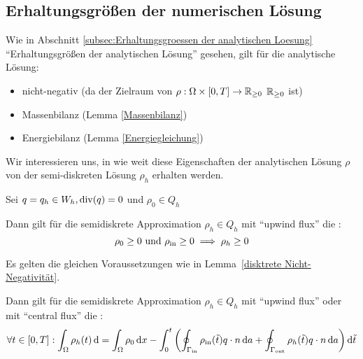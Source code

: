 \subsection{Erhaltungsgrößen der numerischen Lösung}

\begin{repetition}
	Wie in Abschnitt \ref{subsec:Erhaltungsgroessen der analytischen Loesung} \enquote{Erhaltungsgrößen der analytischen Lösung} gesehen, gilt für die analytische Lösung:
	\begin{itemize}
		\item nicht-negativ (da der Zielraum von $ \rho: \Omega \times [0,T] \to \mathbb{R}_{\geq 0}$ $ \mathbb{R}_{\geq 0} $ ist)
		\item Massenbilanz (Lemma \ref{Massenbilanz})
		\item Energiebilanz (Lemma \ref{Energiegleichung})
	\end{itemize}
\end{repetition}

Wir interessieren uns, in wie weit diese Eigenschaften der analytischen Lösung $ \rho $ von der semi-diskreten Lösung $ \rho_h $ erhalten werden.


 
\begin{Lemma} \label{disktrete Nicht-Negativität}
		Sei $ q = q_h \in W_h, \operatorname{div}(q) = 0 $ und $ \rho_0 \in Q_h $ %
	
	Dann gilt für die semidiskrete Approximation $ \rho_h \in Q_h$ mit \enquote{upwind flux} die :
	\[ \rho_0 \geq 0 \text{ und } \rho_{\text{in}} \geq 0 \implies \rho_h \geq 0 \]
\end{Lemma}

\begin{Lemma} \label{diskrete Massenbilanz}
	Es gelten die gleichen Voraussetzungen wie in Lemma~\ref{disktrete Nicht-Negativität}.
	
	Dann gilt für die semidiskrete Approximation $ \rho_h \in Q_h$ mit \enquote{upwind flux} oder mit \enquote{central flux} die :
	\[\forall t \in [0,T]: \int_\Omega \rho_h(t) \mathop{}\!\mathrm{d}   = \int_\Omega \rho_0 \mathop{}\!\mathrm{d} x - \int_{0}^{t} \left( \oint_{\Gamma_{{\text{in}}}} \rho_{\text{in}}(\tilde{t}) q \cdot n \mathop{}\!\mathrm{d} a + \oint_{\Gamma_{{\text{out}}}} \rho_h(\tilde{t}) q \cdot n \mathop{}\!\mathrm{d} a  \right) \mathop{}\!\mathrm{d} \tilde{t} \]
\end{Lemma}

